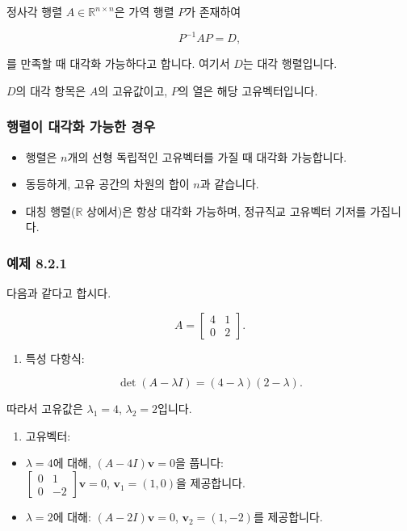 \documentclass[
  12pt,
  a4paper,
]{article}
\begin{document}
정사각 행렬 \(A \in \mathbb{R}^{n \times n}\)은 가역 행렬 \(P\)가 존재하여

\[P^{-1} A P = D,\]

를 만족할 때 대각화 가능하다고 합니다. 여기서 \(D\)는 대각 행렬입니다.

\(D\)의 대각 항목은 \(A\)의 고유값이고, \(P\)의 열은 해당 고유벡터입니다.

\subsubsection{행렬이 대각화 가능한 경우}\label{when-is-a-matrix-diagonalizable}

\begin{itemize}
\item
  행렬은 \(n\)개의 선형 독립적인 고유벡터를 가질 때 대각화 가능합니다.
\item
  동등하게, 고유 공간의 차원의 합이 \(n\)과 같습니다.
\item
  대칭 행렬(\(\mathbb{R}\) 상에서)은 항상 대각화 가능하며, 정규직교 고유벡터 기저를 가집니다.
\end{itemize}

\subsubsection{예제 8.2.1}\label{example-821}

다음과 같다고 합시다.

\[A = \begin{bmatrix} 4 & 1 \\ 0 & 2 \end{bmatrix}.\]

\begin{enumerate}
\def\labelenumi{\arabic{enumi}.}
\item
  특성 다항식:
\end{enumerate}

\[\det(A - \lambda I) = (4-\lambda)(2-\lambda).\]

따라서 고유값은 \(\lambda_1 = 4\), \(\lambda_2 = 2\)입니다.

\begin{enumerate}
\def\labelenumi{\arabic{enumi}.}
\item
  고유벡터:
\end{enumerate}

\begin{itemize}
\item
  \(\lambda = 4\)에 대해, \((A-4I)\mathbf{v}=0\)을 풉니다:\\
  \(\begin{bmatrix} 0 & 1 \\ 0 & -2 \end{bmatrix}\mathbf{v} = 0\), \(\mathbf{v}_1 = (1,0)\)을 제공합니다.
\item
  \(\lambda = 2\)에 대해: \((A-2I)\mathbf{v}=0\), \(\mathbf{v}_2 = (1,-2)\)를 제공합니다.
\end{itemize}
\end{document}
